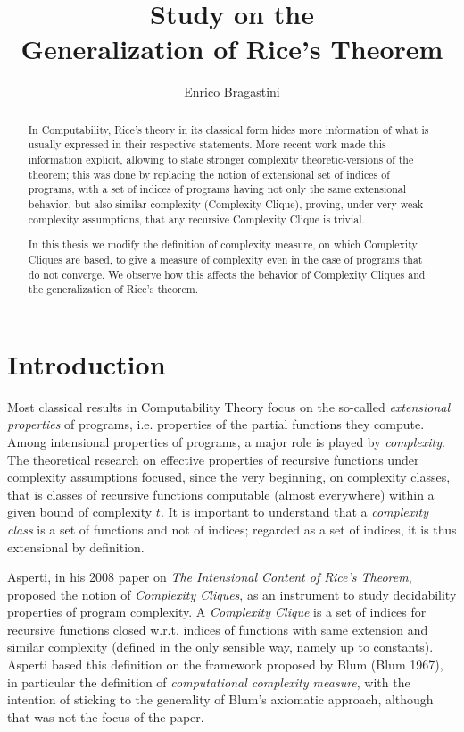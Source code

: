 \documentclass[10pt, a4paper, oneside, titlepage, draft]{article}
\title{Study on the\\Generalization of Rice's Theorem}
\author{Enrico Bragastini}
\date{}
\begin{document}
\maketitle

\begin{abstract}
In Computability, Rice's theory in its classical form hides more information of what is usually expressed in their respective statements. More recent work made this information explicit, allowing to state stronger complexity theoretic-versions of the theorem; this was done by replacing the notion of extensional set of indices of programs, with a set of indices of programs having not only the same extensional behavior, but also similar complexity (Complexity Clique), proving, under very weak complexity assumptions, that any recursive Complexity Clique is trivial. 

In this thesis we modify the definition of complexity measure, on which Complexity Cliques are based, to give a measure of complexity even in the case of programs that do not converge. We observe how this affects the behavior of Complexity Cliques and the generalization of Rice's theorem.
\end{abstract}

\section{Introduction}
Most classical results in Computability Theory focus on the so-called \textit{extensional properties} of programs, i.e. properties of the partial functions they compute.
Among intensional properties of programs, a major role is played by \textit{complexity}.
The theoretical research on effective properties of recursive functions under complexity assumptions focused, since the very beginning, on complexity classes, that is classes of recursive functions computable (almost everywhere) within a given bound of complexity $t$.
It is important to understand that a \textit{complexity class} is a set of functions and not of indices; regarded as a set of indices, it is thus extensional by definition.

Asperti, in his 2008 paper on \textit{The Intensional Content of Rice's Theorem}, proposed the notion of \textit{Complexity Cliques}, as an instrument to study decidability properties of program complexity.
A \textit{Complexity Clique} is a set of indices for recursive functions closed w.r.t. indices of functions with same extension and similar complexity (defined in the only sensible way, namely up to constants).
Asperti based this definition on the framework proposed by Blum (Blum 1967), in particular the definition of \textit{computational complexity measure}, with the intention of sticking to the generality of Blum's axiomatic approach, although that was not the focus of the paper.
\end{document}
